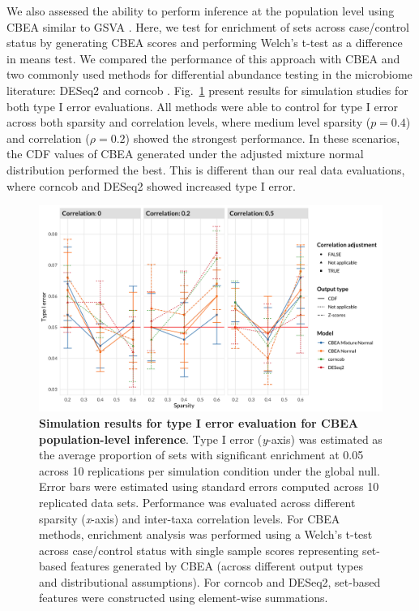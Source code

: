 \documentclass{article}
\begin{document}
We also assessed the ability to perform inference at the population level using CBEA similar to GSVA \cite{hanzelmann2013}. Here, we test for enrichment of sets across case/control status by generating CBEA scores and performing Welch's t-test as a difference in means test. We compared the performance of this approach with CBEA and two commonly used methods for differential abundance testing in the microbiome literature: DESeq2 \cite{love2014} and corncob \cite{martin2020}. Fig.~\ref{fig:s2} present results for simulation studies for both type I error evaluations. All methods were able to control for type I error across both sparsity and correlation levels, where medium level sparsity ($p = 0.4$) and correlation ($\rho = 0.2$) showed the strongest performance. In these scenarios, the CDF values of CBEA generated under the adjusted mixture normal distribution performed the best. This is different than our real data evaluations, where corncob and DESeq2 showed increased type I error.    
\begin{figure}[!h]
    \centering
    \includegraphics[width=\textwidth]{figures/sim_diffab_fdr.png}
    \caption{\textbf{Simulation results for type I error evaluation for CBEA population-level inference}. Type I error (\emph{y}-axis) was estimated as the average proportion of sets with significant enrichment at 0.05 across 10 replications per simulation condition under the global null. Error bars were estimated using standard errors computed across 10 replicated data sets. Performance was evaluated across different sparsity (\emph{x}-axis) and inter-taxa correlation levels. For CBEA methods, enrichment analysis was performed using a Welch's t-test across case/control status with single sample scores representing set-based features generated by CBEA (across different output types and distributional assumptions). For corncob and DESeq2, set-based features were constructed using element-wise summations.} 
    \label{fig:s2}
\end{figure}
\end{document}
